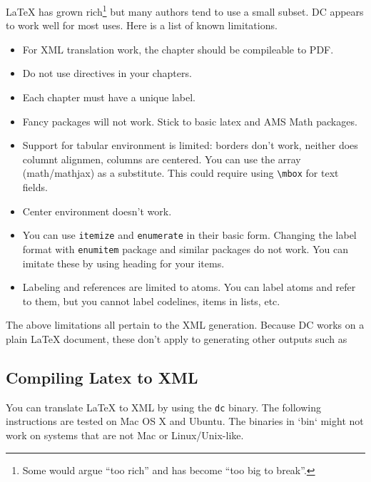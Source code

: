 LaTeX has grown rich\footnote{Some would argue ``too rich'' and has become ``too big to break''.} but many authors tend to use a small subset.  
%
DC appears to work well for most uses. 
%
Here is a list of known limitations.  
\begin{itemize}

\item For XML translation work, the chapter should be compileable to PDF.

\item Do not use \lstinline`` directives in your chapters.

\item Each chapter must have a unique label.

\item Fancy packages will not work.  Stick to basic latex and AMS Math packages.

\item Support for tabular environment is limited: borders don't work, neither does columnt alignmen, columns are centered.  You can use the array (math/mathjax) as a substitute.  This could require using \lstinline`\mbox` for text fields.  
 
\item Center environment doesn't work.

\item You can use \lstinline`itemize` and \lstinline`enumerate` in their basic form.  Changing the label format with \lstinline`enumitem` package and similar packages do not work.  You can imitate these by using heading for your items.  

\item Labeling and references are limited to atoms.  You can label atoms and refer to them, but you cannot label codelines, items in lists, etc.

\end{itemize}

\begin{remark}
The above limitations all pertain to the XML generation.  Because DC works on a plain LaTeX document, these don't apply to generating other outputs such as 
\end{remark}  

\subsection{Compiling Latex to XML}

You can translate LaTeX to XML by using the \lstinline`dc` binary.
%
The following instructions are tested on Mac OS X and Ubuntu.  The binaries in `bin` might not work on systems that are not Mac or Linux/Unix-like. 


